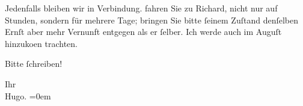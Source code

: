 \pstart
           Jedenfalls bleiben wir in Verbindung.  fahren
               Sie zu Richard, nicht nur auf Stunden, sondern
               für mehrere Tage; bringen Sie bitte{ }ſeinem Zuſtand denſelben Ernſt aber mehr {\pb}Vernunft entgegen als er{ }ſelber.
               Ich werde auch im Auguſt hinzuko{\geminationm}en
               trachten.\pend
           
\pstart
           Bitte{ }ſchreiben!\pend
           
\pstart
           Ihr{\\[\baselineskip]}\spacefill\mbox{Hugo.}\pend
           \leftskip=0em{}\endnumbering{}  \newcommand{\dateiname}{L00944}\newcommand{\titel}{Hugo von Hofmannsthal an Arthur Schnitzler, 15. 7. [1899]}\newcommand{\editorInnen}{Martin Anton Müller und Gerd-Hermann Susen}
